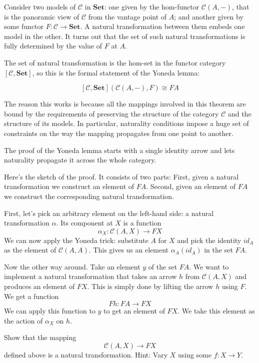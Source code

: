\documentclass[DaoFP]{subfiles}
\begin{document}
Consider two models of $\mathcal{C}$ in $\mathbf{Set}$: one given by the hom-functor  $\mathcal{C}(A, -)$, that is the panoramic view of $\mathcal{C}$ from the vantage point of $A$; and another given by some functor $F \colon \mathcal{C} \to \mathbf{Set}$. A natural transformation between them embeds one model in the other. It turns out that the set of such natural transformations is fully determined by the value of $F$ at $A$.

The set of natural transformation is the hom-set in the functor category $[\mathcal{C}, \mathbf{Set}]$, so this is the formal statement of the Yoneda lemma:

\[ [\mathcal{C}, \mathbf{Set}]( \mathcal{C}(A, -), F) \cong F A \]

The reason this works is because all the mappings involved in this theorem are bound by the requirements of preserving the structure of the category $\mathcal{C}$ and the structure of its models. In particular, naturality conditions impose a huge set of constraints on the way the mapping propagates from one point to another. 

The proof of the Yoneda lemma starts with a single identity arrow and lets naturality propagate it across the whole category.

Here's the sketch of the proof. It consists of two parts: First, given a natural transformation we construct an element of $F A$. Second, given an element of $F A$ we construct the corresponding natural transformation. 

First, let's pick an arbitrary element on the left-hand side: a natural transformation $\alpha$. Its component at $X$ is a function
\[ \alpha_X \colon \mathcal{C}(A, X) \to F X \]
We can now apply the Yoneda trick: substitute $A$ for $X$ and pick the identity $id_A$ as the element of $\mathcal{C}(A, A)$. This gives us an element $\alpha_A (id_A)$ in the set $F A$.

Now the other way around. Take an element $y$ of the set $F A$. We want to implement a natural transformation that takes an arrow $h$ from $ \mathcal{C}(A, X)$ and produces an element of $F X$. This is simply done by lifting the arrow $h$ using $F$. We get a function
\[F h \colon F A \to F X \]
We can apply this function to $y$ to get an element of $F X$. We take this element as the action of $\alpha_X$ on $h$.

\begin{exercise}
Show that the mapping 
\[ \mathcal{C}(A, X) \to F X\]
defined above is a natural transformation. Hint: Vary $X$ using some $f \colon X \to Y$.
\end{exercise}
\end{document}
